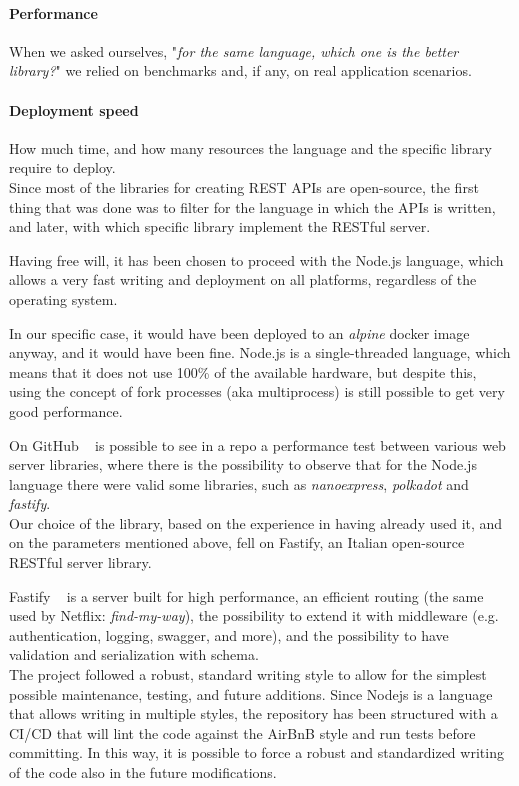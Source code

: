 \documentclass[]{IEEEtran}
\begin{document}
\paragraph{Performance}
When we asked ourselves, "\textit{for the same language, which one is the better library?}" we relied on benchmarks and, if any, on real application scenarios.
\paragraph{Deployment speed}
How much time, and how many resources the language and the specific library require to deploy.
\\

Since most of the libraries for creating REST APIs are open-source, the first thing that was done was to filter for the language in which the APIs is written, and later, with which specific library implement the RESTful server.


Having free will, it has been chosen to proceed with the Node.js language, which allows a very fast writing and deployment on all platforms, regardless of the operating system.

In our specific case, it would have been deployed to an \textit{alpine} docker image anyway, and it would have been fine.
Node.js is a single-threaded language, which means that it does not use 100\% of the available hardware, but despite this, using the concept of fork processes (aka multiprocess) is still possible to get very good performance.

On GitHub ~\cite{gitweb} is possible to see in a repo a performance test between various web server libraries, where there is the possibility to observe that for the Node.js language there were valid some libraries, such as \textit{nanoexpress}, \textit{polkadot} and \textit{fastify}.
\\
Our choice of the library, based on the experience in having already used it, and on the parameters mentioned above, fell on Fastify, an Italian open-source RESTful server library.

Fastify ~\cite{fastify} is a server built for high performance, an efficient routing (the same used by Netflix: \textit{find-my-way}), the possibility to extend it with middleware (e.g. authentication, logging, swagger, and more), and the possibility to have validation and serialization with schema.
\\

The project followed a robust, standard writing style to allow for the simplest possible maintenance, testing, and future additions. 
Since Nodejs is a language that allows writing in multiple styles, the repository has been structured with a CI/CD that will lint the code against the AirBnB style and run tests before committing. In this way, it is possible to force a robust and standardized writing of the code also in the future modifications.
\\
\end{document}
